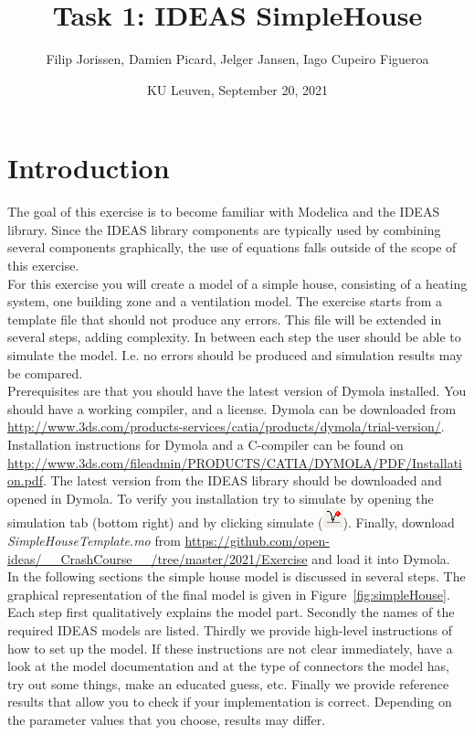 \documentclass[10pt,a4paper]{article}
\begin{document}
\title{Task 1: IDEAS SimpleHouse}
\author{Filip Jorissen, Damien Picard, Jelger Jansen, Iago Cupeiro Figueroa}
\date{KU Leuven, September 20, 2021}
\maketitle


\doclicenseThis


\section*{Introduction}
The goal of this exercise is to become familiar with 
Modelica and the IDEAS library. 
Since the IDEAS library components are typically used
by combining several components graphically, the use of 
equations falls outside of the scope of this exercise.\\

For this exercise you will create a model of a simple house,
consisting of a heating system, one building zone 
and a ventilation model. 
The exercise starts from a template file that should 
not produce any errors. This file will be extended in
several steps, adding complexity.
In between each step the user should be able to simulate the
model. I.e. no errors should be produced and simulation results 
may be compared.\\

Prerequisites are that you should have the latest version of Dymola
installed. You should have a working compiler, and a license. 
Dymola can be downloaded from 
\url{http://www.3ds.com/products-services/catia/products/dymola/trial-version/}. 
Installation instructions for Dymola and a C-compiler can be found on 
\url{http://www.3ds.com/fileadmin/PRODUCTS/CATIA/DYMOLA/PDF/Installation.pdf}.
The latest version from the IDEAS library should be downloaded and opened in Dymola. 
To verify you installation try to simulate  by opening the simulation tab (bottom right) and by clicking simulate (\includegraphics[scale=0.5]{simulate.png}). Finally, download 
\textit{SimpleHouseTemplate.mo} from \url{https://github.com/open-ideas/__CrashCourse__/tree/master/2021/Exercise}
and load it into Dymola.\\

In the following sections the simple house model is discussed 
in several steps. The graphical representation of the final model is 
given in Figure~\ref{fig:simpleHouse}.
Each step first qualitatively explains the model part.
Secondly the names of the required IDEAS models 
are listed.
Thirdly we provide high-level instructions of how to
set up the model.
If these instructions are not clear immediately, 
have a look at the model documentation and at the type of
connectors the model has, 
try out some things, 
make an educated guess, etc.
Finally we provide reference results that allow you to check
if your implementation is correct. 
Depending on the parameter values that you choose, results
may differ.
 
\end{document}
